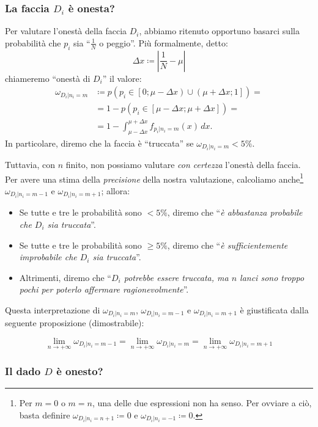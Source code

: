 \documentclass{article}
\begin{document}
\begin{appendices}
\subsubsection{La faccia $D_i$ è onesta?}
Per valutare l'onestà della faccia $D_i$, abbiamo ritenuto opportuno basarci sulla probabilità
che $p_i$ sia “$\frac{1}{N}$ o peggio”. Più formalmente, detto:
\[\Delta x \coloneqq \left|\frac{1}{N} - \mu\right|\]
chiameremo “onestà di $D_i$” il valore:
\[\begin{aligned}
\omega_{D_i|n_i=m} &\coloneqq p(p_i\in\left[0;\mu-\Delta x\right)\cup\left(\mu+\Delta x;1\right])=\\
    &=1-p(p_i\in\left[\mu-\Delta x;\mu+\Delta x\right])=\\
    &=1-\int_{\mu-\Delta x}^{\mu+\Delta x}f_{p_i|n_i=m}(x)\,dx.
\end{aligned}\]
In particolare, diremo che la faccia è “truccata” se $\omega_{D_i|n_i=m}<5\%$.

Tuttavia, con $n$ finito, non possiamo valutare \emph{con certezza} l'onestà della faccia.
Per avere una stima della \emph{precisione} della nostra valutazione, calcoliamo anche\footnote{
    Per $m=0$ o $m=n$, una delle due espressioni non ha senso. Per ovviare a ciò,
    basta definire $\omega_{D_i|n_i=n+1}\coloneqq0$ e $\omega_{D_i|n_i=-1}\coloneqq0$.
}
$\omega_{D_i|n_i=m-1}$ e $\omega_{D_i|n_i=m+1}$; allora:
\begin{itemize}
    \item Se tutte e tre le probabilità sono $<5\%$, diremo che
          “\emph{è abbastanza probabile che $D_i$ sia truccata}”.
    \item Se tutte e tre le probabilità sono $\ge5\%$, diremo che
          “\emph{è sufficientemente improbabile che $D_i$ sia truccata}”.
    \item Altrimenti, diremo che
          “\emph{$D_i$ potrebbe essere truccata, ma $n$ lanci sono troppo pochi per poterlo
          affermare ragionevolmente}”.
\end{itemize}
Questa interpretazione di $\omega_{D_i|n_i=m}$, $\omega_{D_i|n_i=m-1}$ e $\omega_{D_i|n_i=m+1}$
è giustificata dalla seguente proposizione (dimostrabile):

\[
    \lim_{n\rightarrow+\infty}\omega_{D_i|n_i=m-1} =
    \lim_{n\rightarrow+\infty}\omega_{D_i|n_i=m} =
    \lim_{n\rightarrow+\infty}\omega_{D_i|n_i=m+1}
\]

\subsubsection{Il dado $D$ è onesto?}


\end{appendices}
\end{document}
